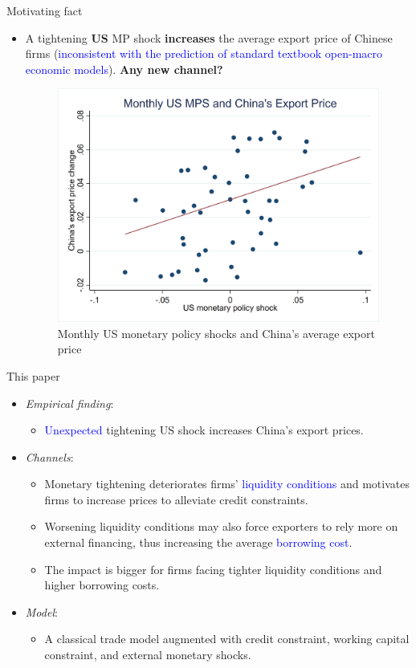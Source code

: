 \documentclass[10pt]{beamer}
\begin{document}
\begin{frame}{Motivating fact}
    \begin{itemize}
        \item A tightening \textbf{US} MP shock \textbf{increases} the average export price of Chinese firms (\textcolor{blue}{inconsistent with the prediction of standard textbook open-macro economic models}). \textbf{Any new channel?}
        \begin{figure}[htbp]
            \centering
            \includegraphics[width=0.7\columnwidth]{latex/slides/pic_Nov2023/brw_monthly.png}
            \caption{Monthly US monetary policy shocks and China's average export price}
            \label{fig.US_shock}
        \end{figure}
    \end{itemize}
\end{frame}

\begin{frame}{This paper}

\begin{itemize}
    \item \textit{Empirical finding}: 
        \begin{itemize}
        \item \textcolor{blue}{Unexpected} tightening US shock increases China's export prices.
        \end{itemize}
    \medskip
    \item \textit{Channels}: 
    \begin{itemize}
        \item Monetary tightening deteriorates firms' \textcolor{blue}{liquidity conditions} and motivates firms to increase prices to alleviate credit constraints.
        \item Worsening liquidity conditions may also force exporters to rely more on external financing, thus increasing the average \textcolor{blue}{borrowing cost}.
        \item The impact is bigger for firms facing tighter liquidity conditions and higher borrowing costs. 
    \end{itemize}
    \medskip
    \item \textit{Model}: 
        \begin{itemize}
        \item A classical trade model augmented with credit constraint, working capital constraint, and external monetary shocks.
        \end{itemize}
\end{itemize}
\end{frame}
\end{document}
